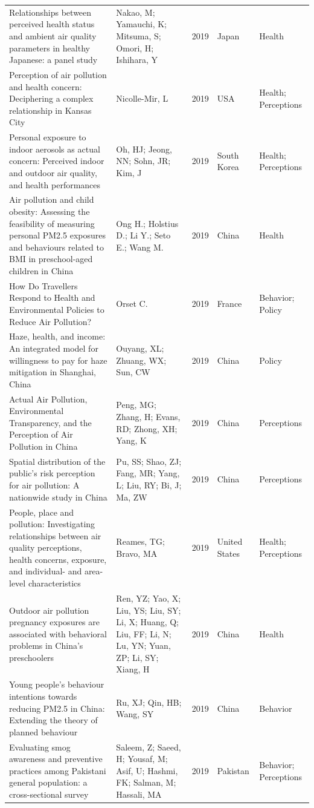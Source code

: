 {\begin{longtable}[t]{p{6cm}p{3cm}lp{3cm}p{3cm}}
\addlinespace
Relationships between perceived health status and ambient air quality parameters in healthy Japanese: a panel study & Nakao, M; Yamauchi, K; Mitsuma, S; Omori, H; Ishihara, Y & 2019 & Japan & Health\\
Perception of air pollution and health concern: Deciphering a complex relationship in Kansas City & Nicolle-Mir, L & 2019 & USA & Health; Perceptions\\
Personal exposure to indoor aerosols as actual concern: Perceived indoor and outdoor air quality, and health performances & Oh, HJ; Jeong, NN; Sohn, JR; Kim, J & 2019 & South Korea & Health; Perceptions\\
Air pollution and child obesity: Assessing the feasibility of measuring personal PM2.5 exposures and behaviours related to BMI in preschool-aged children in China & Ong H.; Holstius D.; Li Y.; Seto E.; Wang M. & 2019 & China & Health\\
How Do Travellers Respond to Health and Environmental Policies to Reduce Air Pollution? & Orset C. & 2019 & France & Behavior; Policy\\
\addlinespace
Haze, health, and income: An integrated model for willingness to pay for haze mitigation in Shanghai, China & Ouyang, XL; Zhuang, WX; Sun, CW & 2019 & China & Policy\\
Actual Air Pollution, Environmental Transparency, and the Perception of Air Pollution in China & Peng, MG; Zhang, H; Evans, RD; Zhong, XH; Yang, K & 2019 & China & Perceptions\\
Spatial distribution of the public's risk perception for air pollution: A nationwide study in China & Pu, SS; Shao, ZJ; Fang, MR; Yang, L; Liu, RY; Bi, J; Ma, ZW & 2019 & China & Perceptions\\
People, place and pollution: Investigating relationships between air quality perceptions, health concerns, exposure, and individual- and area-level characteristics & Reames, TG; Bravo, MA & 2019 & United States & Health; Perceptions\\
Outdoor air pollution pregnancy exposures are associated with behavioral problems in China's preschoolers & Ren, YZ; Yao, X; Liu, YS; Liu, SY; Li, X; Huang, Q; Liu, FF; Li, N; Lu, YN; Yuan, ZP; Li, SY; Xiang, H & 2019 & China & Health\\
\addlinespace
Young people's behaviour intentions towards reducing PM2.5 in China: Extending the theory of planned behaviour & Ru, XJ; Qin, HB; Wang, SY & 2019 & China & Behavior\\
Evaluating smog awareness and preventive practices among Pakistani general population: a cross-sectional survey & Saleem, Z; Saeed, H; Yousaf, M; Asif, U; Hashmi, FK; Salman, M; Hassali, MA & 2019 & Pakistan & Behavior; Perceptions\\

\end{longtable}}
